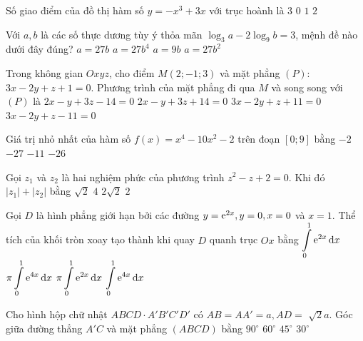 \begin{ex}%
Số giao điểm của đồ thị hàm số $y=-x^3+3 x$ với trục hoành là
\choice
{\True $3$}
{$0$}
{$1$}
{$2$}

\end{ex}
\begin{ex}%
Với $a, b$ là các số thực dương tùy ý thỏa mãn $\log_3 a-2\log_9 b=3$, mệnh đề nào dưới đây đúng?
\choice
{\True $a=27 b$}
{$a=27 b^4$}
{$a=9 b$}
{$a=27 b^2$}

\end{ex}
\begin{ex}%
Trong không gian $O x y z$, cho điểm $M(2;-1; 3)$ và mặt phẳng $(P)$: $3 x-2 y+z+1=0$. Phương trình của mặt phẳng đi qua $M$ và song song với $(P)$ là
\choice
{\True $2 x-y+3 z-14=0$}
{$2 x-y+3 z+14=0$}
{$3 x-2 y+z+11=0$}
{$3 x-2 y+z-11=0$}

\end{ex}
\begin{ex}%
Giá trị nhỏ nhất của hàm số $f(x)=x^4-10 x^2-2$ trên đoạn $[0; 9]$ bằng
\choice
{$-2$}
{\True $-27$}
{$-11$}
{$-26$}

\end{ex}
\begin{ex}%
Gọi $z_1$ và $z_2$ là hai nghiệm phức của phương trình $z^2-z+2=0$. Khi đó $\left|z_1\right|+\left|z_2\right|$ bằng
\choice
{$\sqrt{2}$}
{$4$}
{\True $2\sqrt{2}$}
{$2$}

\end{ex}
\begin{ex}%
Gọi $D$ là hình phẳng giới hạn bởi các đường $y={\rm e}^{2 x}, y=0, x=0$ và $x=1$. Thể tích của khối tròn xoay tạo thành khi quay $D$ quanh trục $O x$ bằng
\choice
{$\displaystyle\displaystyle\int\limits_0^1 {\rm e}^{2 x} \mathrm{\,d} x$}
{\True $\pi \displaystyle\displaystyle\int\limits_0^1 {\rm e}^{4 x} \mathrm{\,d} x$}
{$\pi \displaystyle\displaystyle\int\limits_0^1 {\rm e}^{2 x} \mathrm{\,d} x$}
{$\displaystyle\displaystyle\int\limits_0^1 {\rm e}^{4 x} \mathrm{\,d} x$}

\end{ex}
\begin{ex}%
Cho hình hộp chữ nhật $ABCD \cdot A'B'C'D'$ có $AB=AA'=a, AD=$ $\sqrt{2} a$. Góc giữa đường thẳng $A'C$ và mặt phẳng $(ABCD)$ bằng
\choice
{$90^{\circ}$}
{$60^{\circ}$}
{$45^{\circ}$}
{\True $30^{\circ}$}

\end{ex}

